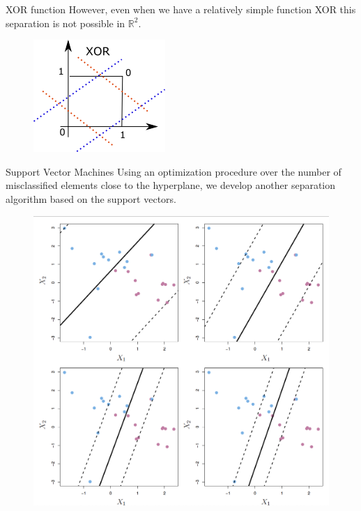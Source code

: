 \documentclass{beamer}
\begin{document}
\begin{frame}{XOR function}
	However, even when we have a relatively simple function XOR this separation is not possible in $\mathbb{R}^2$.
\begin{figure}[h]
	\centering
	\includegraphics[scale=1.2]{Figures/xor_function.png}
\end{figure}	
	
\end{frame}

\begin{frame}{Support Vector Machines}
	Using an optimization procedure over the number of misclassified elements close to the hyperplane, we develop another separation algorithm based on the support vectors.
\begin{figure}[h]
	\centering
	\includegraphics[scale=0.25]{Figures/fig_changing_c_svm.png}
\end{figure}		
	
\end{frame}
\end{document}
